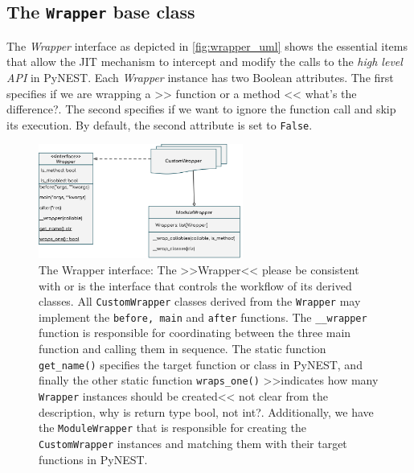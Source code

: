 \subsection{The \texttt{Wrapper} base class}

The \emph{Wrapper} interface as depicted in \autoref{fig:wrapper_uml} shows the essential items that allow the JIT mechanism to intercept and modify the calls to the \emph{high level API} in PyNEST. Each \emph{Wrapper} instance has two Boolean attributes. The first specifies if we are wrapping a >> function or a method << what's the difference?. The second specifies if we want to ignore the function call and skip its execution. By default, the second attribute is set to \texttt{False}.

\begin{figure}[ht!]
\centering
\includegraphics[width=0.6\textwidth]{src/pic/wrapper_uml.png}
\caption{The Wrapper interface: The >>Wrapper<< please be consistent with \emph{} or \texttt{} is the interface that controls the workflow of its derived classes. All \texttt{CustomWrapper} classes derived from the \texttt{Wrapper} may implement the \texttt{before, main} and \texttt{after} functions. The \texttt{\_\_wrapper} function is responsible for coordinating between the three main function and calling them in sequence. The static function \texttt{get\_name()} specifies the target function or class in PyNEST, and finally the other static function \texttt{wraps\_one()} >>indicates how many \texttt{Wrapper} instances should be created<< not clear from the description, why is return type bool, not int?. Additionally, we have the \texttt{ModuleWrapper} that is responsible for creating the \texttt{CustomWrapper} instances and matching them with their target functions in PyNEST.}
\label{fig:wrapper_uml}
\end{figure}

